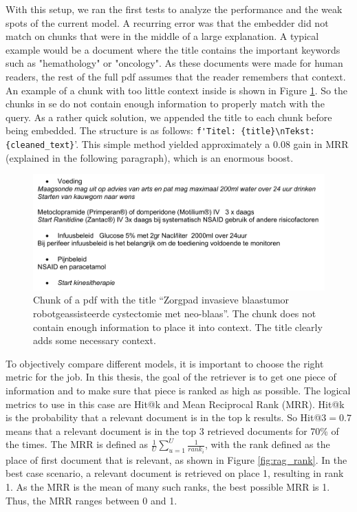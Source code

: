 With this setup, we ran the first tests to analyze the performance and the weak spots of the current model. A recurring error was that the embedder did not match on chunks that were in the middle of a large explanation. A typical example would be a document where the title contains the important keywords such as "hemathology" or "oncology". As these documents were made for human readers, the rest of the full pdf assumes that the reader remembers that context. An example of a chunk with too little context inside is shown in Figure \ref{fig:out_of_context_zenya_doc}. So the chunks in se do not contain enough information to properly match with the query. As a rather quick solution, we appended the title to each chunk before being embedded. The structure is as follows: \verb|f'Titel: {title}\nTekst: {cleaned_text}|'. This simple method yielded approximately a 0.08 gain in MRR (explained in the following paragraph), which is an enormous boost.

\begin{figure}[h]
    \centerline{\includegraphics[width=1\linewidth]{fig/out_of_context_zenya_doc.png}}
    \caption{Chunk of a pdf with the title ``Zorgpad invasieve blaastumor robotgeassisteerde cystectomie met neo-blaas''. The chunk does not contain enough information to place it into context. The title clearly adds some necessary context.}
    \label{fig:out_of_context_zenya_doc}
\end{figure}

To objectively compare different models, it is important to choose the right metric for the job. In this thesis, the goal of the retriever is to get one piece of information and to make sure that piece is ranked as high as possible. The logical metrics to use in this case are Hit@k and Mean Reciprocal Rank (MRR). Hit@k is the probability that a relevant document is in the top k results. So Hit@3$=0.7$ means that a relevant document is in the top 3 retrieved documents for 70\% of the times. The MRR is defined as $\frac{1}{U} \sum_{u=1}^U \frac{1}{rank_i}$, with the rank defined as the place of first document that is relevant, as shown in Figure \ref{fig:rag_rank}. In the best case scenario, a relevant document is retrieved on place 1, resulting in rank 1. As the MRR is the mean of many such ranks, the best possible MRR is 1. Thus, the MRR ranges between 0 and 1.

